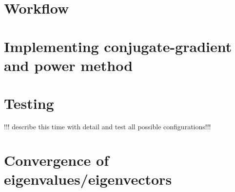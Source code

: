 \documentclass[11pt, letterpaper, onecolumn]{article}
\begin{document}
	
	
	
	\section{Workflow}
	
	
	
	
	\section{Implementing conjugate-gradient and power method}
	
	
	
	
	\section{Testing}
	!!! describe this time with detail and test all possible configurations!!!
	
	
	
	\section{Convergence of eigenvalues/eigenvectors}
\end{document}
